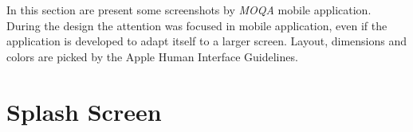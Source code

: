 In this section are present some screenshots by \textit{MOQA} mobile application.\\
During the design the attention was focused in mobile application, even if the application is developed to adapt itself to a larger screen. Layout, dimensions and colors are picked by the Apple Human Interface Guidelines.

\section{Splash Screen}